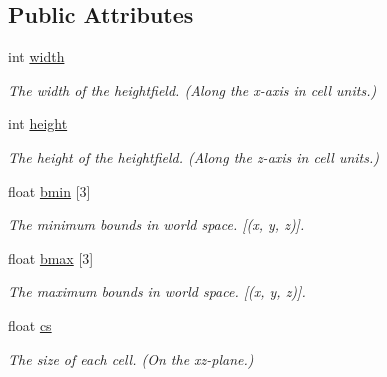 \subsection*{Public Attributes}
\begin{DoxyCompactItemize}
\item 
\mbox{\label{structrcHeightfield_a9dd6e386c167f1537e3c7638f6b9a752}} 
int \hyperlink{structrcHeightfield_a9dd6e386c167f1537e3c7638f6b9a752}{width}
\begin{DoxyCompactList}\small\item\em The width of the heightfield. (Along the x-\/axis in cell units.) \end{DoxyCompactList}\item 
\mbox{\label{structrcHeightfield_a568ceeea7acb4ddf67dd78ec4fee7672}} 
int \hyperlink{structrcHeightfield_a568ceeea7acb4ddf67dd78ec4fee7672}{height}
\begin{DoxyCompactList}\small\item\em The height of the heightfield. (Along the z-\/axis in cell units.) \end{DoxyCompactList}\item 
\mbox{\label{structrcHeightfield_aa870f9af5426e1833fadda77a1d051f3}} 
float \hyperlink{structrcHeightfield_aa870f9af5426e1833fadda77a1d051f3}{bmin} \mbox{[}3\mbox{]}
\begin{DoxyCompactList}\small\item\em The minimum bounds in world space. \mbox{[}(x, y, z)\mbox{]}. \end{DoxyCompactList}\item 
\mbox{\label{structrcHeightfield_a9e7ddf31b6833deabed1c9ad1aa1ae95}} 
float \hyperlink{structrcHeightfield_a9e7ddf31b6833deabed1c9ad1aa1ae95}{bmax} \mbox{[}3\mbox{]}
\begin{DoxyCompactList}\small\item\em The maximum bounds in world space. \mbox{[}(x, y, z)\mbox{]}. \end{DoxyCompactList}\item 
\mbox{\label{structrcHeightfield_a3f28962585b2f726d809b1a86b925edb}} 
float \hyperlink{structrcHeightfield_a3f28962585b2f726d809b1a86b925edb}{cs}
\begin{DoxyCompactList}\small\item\em The size of each cell. (On the xz-\/plane.) \end{DoxyCompactList}\item 

\end{DoxyCompactItemize}
